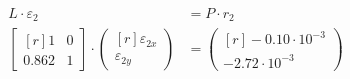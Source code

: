 \documentclass[../main.tex]{subfiles}
\begin{document}
\begin{example}
\begin{enumerate}
                    \begin{equation}
                        \begin{split}
                            L \cdot \varepsilon_2  &= P \cdot r_2 \\
                            \begin{bmatrix*}[r]
                                1 & 0\\
                                0.862 & 1
                            \end{bmatrix*} \cdot
                            \begin{pmatrix*}[r]
                                \varepsilon_{2x}\\
                                \varepsilon_{2y}
                            \end{pmatrix*} &=
                            \begin{pmatrix*}[r]
                                -0.10 \cdot 10^{-3} \\
                                -2.72 \cdot 10^{-3}
                            \end{pmatrix*}
                        \end{split}
                    \end{equation}
                                    
            \end{enumerate}


            

        \end{example}
\end{document}
